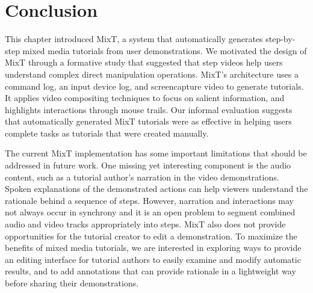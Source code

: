 \section{Conclusion}

This chapter introduced MixT, a system that automatically generates step-by-step mixed media tutorials from user demonstrations. We motivated the design of MixT through a formative study that suggested that step videos help users understand complex direct manipulation operations. MixT’s architecture uses a command log, an input device log, and screencapture video to generate tutorials. It applies video compositing techniques to focus on salient information, and highlights interactions through mouse trails. Our informal evaluation suggests that automatically generated MixT tutorials were as effective in helping users complete tasks as tutorials that were created manually.


The current MixT implementation has some important limitations that should be addressed in future work. One missing yet interesting component is the audio content, such as a tutorial author's narration in the video demonstrations. Spoken explanations of the demonstrated actions can help viewers understand the rationale behind a sequence of steps. However, narration and interactions may not always occur in synchrony and it is an open problem to segment combined audio and video tracks appropriately into steps. MixT also does not provide opportunities for the tutorial creator to edit a demonstration. To maximize the benefits of mixed media tutorials, we are interested in exploring ways to provide an editing interface for tutorial authors to easily examine and modify automatic results, and to add annotations that can provide rationale in a lightweight way before sharing their demonstrations.
